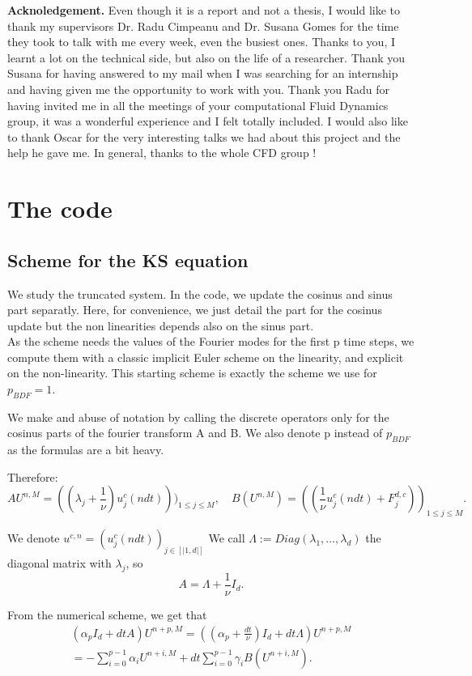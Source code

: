 \documentclass[12pt]{article}
\begin{document}
\textbf{Acknoledgement.} Even though it is a report and not a thesis, I would like
to thank my supervisors Dr. Radu Cimpeanu and Dr. Susana Gomes for the time they
took to talk with me every week, even the busiest ones. Thanks to you, I learnt a lot
on the technical side, but also on the life of a researcher. Thank you Susana for having
answered to my mail when I was searching for an internship and having given me
the opportunity to work with you. Thank you Radu for having invited me in all the
meetings of your computational Fluid Dynamics group, it was a wonderful experience
and I felt totally included. I would also like to thank Oscar for the very interesting
talks we had about this project and the help he gave me. In general, thanks to the
whole CFD group !

\newpage
\appendix
\section{The code}
\subsection{Scheme for the KS equation}\label{KS_computation_numerics}

We study the truncated system. In the code, we update the cosinus and sinus part separatly. Here, for convenience, we just detail the part for the cosinus update but the non linearities depends also on the sinus part.
\\
As the scheme needs the values of the Fourier modes for the first p time steps, we compute them with a classic implicit Euler scheme on the linearity, and explicit on the non-linearity. This starting scheme is exactly the scheme we use for $p_{BDF}=1.$

We make and abuse of notation by calling the discrete operators only for the cosinus parts of the fourier transform A and B. We also denote p instead of $p_{BDF}$ as the formulas are a bit heavy.

Therefore: 
$$AU^{n, M} = ((\lambda_j + \frac{1}{\nu})u_j^c(ndt)))_{1\leq j \leq M}, \quad B(U^{n, M}) = ((\frac{1}{\nu}u_j^c(ndt) + F_j^{d,c}))_{1\leq j \leq M}.$$


We denote $u^{c,n} =(u_j^c(ndt))_{j\in [|1,d|]}$
We call $\Lambda:= Diag(\lambda_1,\dots,\lambda_d)$ the diagonal matrix with $\lambda_j$,  so $$A = \Lambda + \frac{1}{\nu}I_d.$$
  
From the numerical scheme, we get that 
\begin{align*}
  (\alpha_p I_d + dtA)U^{n+p, M} = ((\alpha_p+\frac{dt}{\nu}) I_d + dt\Lambda)U^{n+p, M}\\
  = -\sum_{i=0}^{p-1}\alpha_iU^{n+i, M} + dt\sum_{i=0}^{p-1}\gamma_i B(U^{n+i, M}).
\end{align*}
\end{document}
